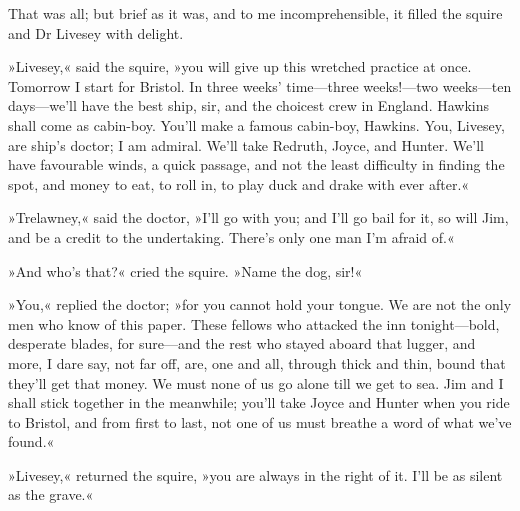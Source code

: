 That was all; but brief as it was, and to me incomprehensible, it filled the squire and Dr Livesey with delight.

»Livesey,« said the squire, »you will give up this wretched practice at once. Tomorrow I start for Bristol. In three weeks' time—three weeks!—two weeks—ten days—we'll have the best ship, sir, and the choicest crew in England. Hawkins shall come as cabin-boy. You'll make a famous cabin-boy, Hawkins. You, Livesey, are ship's doctor; I am admiral. We'll take Redruth, Joyce, and Hunter. We'll have favourable winds, a quick passage, and not the least difficulty in finding the spot, and money to eat, to roll in, to play duck and drake with ever after.«

»Trelawney,« said the doctor, »I'll go with you; and I'll go bail for it, so will Jim, and be a credit to the undertaking. There's only one man I'm afraid of.«

»And who's that?« cried the squire. »Name the dog, sir!«

»You,« replied the doctor; »for you cannot hold your tongue. We are not the only men who know of this paper. These fellows who attacked the inn tonight—bold, desperate blades, for sure—and the rest who stayed aboard that lugger, and more, I dare say, not far off, are, one and all, through thick and thin, bound that they'll get that money. We must none of us go alone till we get to sea. Jim and I shall stick together in the meanwhile; you'll take Joyce and Hunter when you ride to Bristol, and from first to last, not one of us must breathe a word of what we've found.«

»Livesey,« returned the squire, »you are always in the right of it. I'll be as silent as the grave.«
